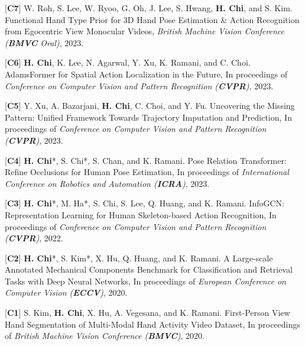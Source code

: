 \begin{cventries}
{\begin{cvitems}
    \item {[\textbf{C7}] W. Roh, S. Lee, W. Ryoo, G. Oh, J. Lee, S. Hwang, \textbf{H. Chi}, and S. Kim. Functional Hand Type Prior for 3D Hand Pose Estimation \& Action Recognition from Egocentric View Monocular Videos, \textit{British Machine Vision Conference (\textbf{BMVC} Oral)}, 2023.}
    \item {[\textbf{C6}] \textbf{H. Chi}, K. Lee, N. Agarwal, Y. Xu, K. Ramani, and C. Choi. AdamsFormer for Spatial Action Localization in the Future, In proceedings of \textit{Conference on Computer Vision and Pattern Recognition (\textbf{CVPR})}, 2023.}
    \item {[\textbf{C5}] Y. Xu, A. Bazarjani, \textbf{H. Chi}, C. Choi, and Y. Fu. Uncovering the Missing Pattern: Unified Framework Towards Trajectory Imputation and Prediction, In proceedings of \textit{Conference on Computer Vision and Pattern Recognition (\textbf{CVPR})}, 2023.}
\end{cvitems}
}

\vspace{-.5em}
\cvpub
{} %
{ %
\begin{cvitems}
    \item {[\textbf{C4}] \textbf{H. Chi}*, S. Chi*, S. Chan, and K. Ramani. Pose Relation Transformer: Refine Occlusions for Human Pose Estimation, In proceedings of \textit{International Conference on Robotics and Automation (\textbf{ICRA})}, 2023.}
    \item {[\textbf{C3}] \textbf{H. Chi}*, M. Ha*, S. Chi, S. Lee, Q. Huang, and K. Ramani. InfoGCN: Representation Learning for Human Skeleton-based Action Recognition, In proceedings of \textit{Conference on Computer Vision and Pattern Recognition (\textbf{CVPR})}, 2022.}
    \item {[\textbf{C2}] \textbf{H. Chi}*, S. Kim*, X. Hu, Q. Huang, and K. Ramani. A Large-scale Annotated Mechanical Components Benchmark for Classification and Retrieval Tasks with Deep Neural Networks, In proceedings of \textit{European Conference on Computer Vision (\textbf{ECCV})}, 2020.}
    \item {[\textbf{C1}] S. Kim, \textbf{H. Chi}, X. Hu, A. Vegesana, and K. Ramani. First-Person View Hand Segmentation of Multi-Modal Hand Activity Video Dataset, In proceedings of \textit{British Machine Vision Conference (\textbf{BMVC})}, 2020.}
\end{cvitems}
}



\end{cventries}
